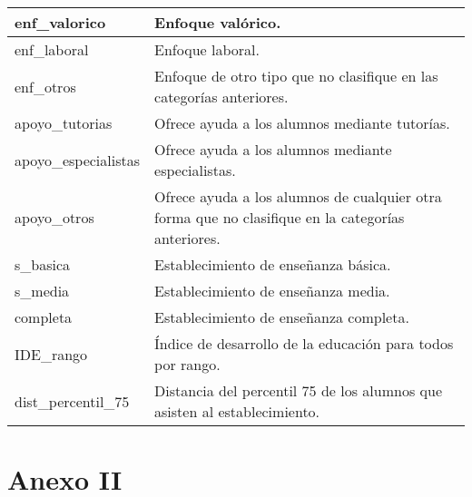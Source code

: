 \begin{longtable}{|p{5cm}|p{9cm}|}
enf\_valorico & Enfoque valórico. \\ \hline
enf\_laboral & Enfoque laboral. \\ \hline
enf\_otros & Enfoque de otro tipo que no clasifique en las categorías anteriores. \\ \hline
apoyo\_tutorias & Ofrece ayuda a los alumnos mediante tutorías. \\ \hline
apoyo\_especialistas & Ofrece ayuda a los alumnos mediante especialistas. \\ \hline
apoyo\_otros & Ofrece ayuda a los alumnos de cualquier otra forma que no clasifique en la categorías anteriores. \\ \hline
s\_basica & Establecimiento de enseñanza básica. \\ \hline
s\_media & Establecimiento de enseñanza media. \\ \hline
completa & Establecimiento de enseñanza completa. \\ \hline
IDE\_rango & Índice de desarrollo de la educación para todos por rango. \\ \hline
dist\_percentil\_75 & Distancia del percentil 75 de los alumnos que asisten al establecimiento. \\ \hline
\end{longtable} 

\chapter{Anexo II}

